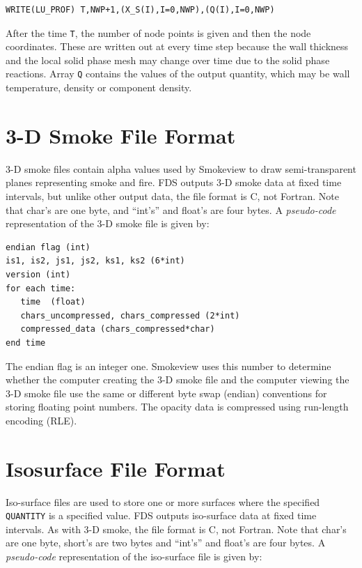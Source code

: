 \documentclass[11pt]{book}
\newcommand{\ct}{\tt\small}
\begin{document}
\footnotesize
\begin{verbatim}
WRITE(LU_PROF) T,NWP+1,(X_S(I),I=0,NWP),(Q(I),I=0,NWP)
\end{verbatim}
\normalsize
After the time {\ct T}, the number of node points is given and then
the node coordinates. These are written out at every time step because
the wall thickness and the local solid phase mesh may change over time
due to the solid phase reactions. Array {\ct Q} contains the values of
the output quantity, which may be wall temperature, density or
component density.

\section{3-D Smoke File Format}
\label{out:SMOKE3D}

3-D smoke files contain alpha values used by Smokeview to draw
semi-transparent planes representing smoke and fire.
FDS outputs 3-D smoke data at fixed time
intervals, but unlike other output data, the file format is C, not Fortran. Note that char's are one byte, and ``int's'' and
float's are four bytes. A {\em pseudo-code} representation of the 3-D
smoke file is given by:

\footnotesize
\begin{verbatim}
endian flag (int)
is1, is2, js1, js2, ks1, ks2 (6*int)
version (int)
for each time:
   time  (float)
   chars_uncompressed, chars_compressed (2*int)
   compressed_data (chars_compressed*char)
end time
\end{verbatim}
\normalsize

\noindent
The endian flag is an integer one.  Smokeview uses this number to
determine whether the computer creating the 3-D smoke file and the
computer viewing the 3-D smoke file use the same or different byte
swap (endian) conventions for storing floating point numbers.  The
opacity data is compressed using run-length encoding (RLE).

\section{Isosurface File Format}
\label{out:ISOF}

Iso-surface files are used to store one or more surfaces where the specified {\ct QUANTITY} is a specified value. FDS outputs iso-surface data at fixed
time intervals.  As with 3-D smoke, the file format is C, not Fortran. Note that char's are one byte, short's are two bytes and ``int's'' and float's are four bytes.
A {\em pseudo-code} representation of the iso-surface file is given by:
\end{document}
